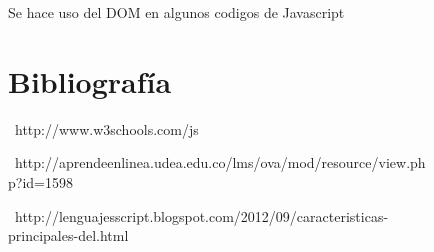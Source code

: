 \documentclass[11pt]{article} %
\begin{document}
\begin{figure}
\begin{center}
Se hace uso del DOM en algunos codigos de Javascript

\end{center}


\section{Bibliografía}


\  {http://www.w3schools.com/js }

\  {http://aprendeenlinea.udea.edu.co/lms/ova/mod/resource/view.php?id=1598 }

\  {http://lenguajesscript.blogspot.com/2012/09/caracteristicas-principales-del.html }

\end{figure}


\lstset{language=Pascal}          %
\end{document}
